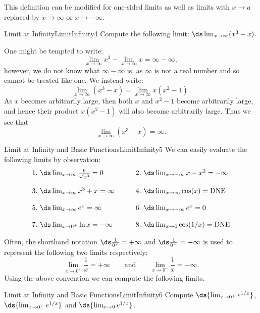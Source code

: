 This definition can be modified for one-sided limits as well as limits with $x\to a$ replaced by $x\to\infty$ or $x\to-\infty$.

\begin{example}{Limit at Infinity}{LimitInfinity4}
Compute the following limit: $\ds\lim_{x\to\infty}(x^3-x).$
\end{example}

\begin{solution} 
One might be tempted to write:
$$\lim_{x\to\infty}x^3-\lim_{x\to\infty}x=\infty-\infty,$$
however, we do not know what $\infty-\infty$ is, as $\infty$ is not a real number and so cannot be treated like one.
We instead write:
$$\lim_{x\to\infty}(x^3-x)=\lim_{x\to\infty}x(x^2-1).$$
As $x$ becomes arbitrarily large, then both $x$ and $x^2-1$ become arbitrarily large, and hence their product $x(x^2-1)$ will also become arbitrarily large. Thus we see that
$$\lim_{x\to\infty}(x^3-x)=\infty.$$
\end{solution}

\begin{example}{Limit at Infinity and Basic Functions}{LimitInfinity5}
We can easily evaluate the following limits by observation:
\[ \begin{array}{ll}
1.~\ds\lim_{x\to \infty} \frac{6}{\sqrt{x^3}}=0 & \qquad 2.~\ds\lim_{x\to -\infty} x-x^2=-\infty \\
\\
3.~\ds\lim_{x\to \infty}x^3+x=\infty            & \qquad 4.~\ds\lim_{x\to \infty} \cos(x)=\mbox{DNE} \\
\\
5.~\ds\lim_{x\to \infty} e^x=\infty             & \qquad 6.~\ds\lim_{x\to -\infty} e^x=0 \\
\\
7.~\ds\lim_{x\to 0^+} \ln x=-\infty             & \qquad 8.~\ds\lim_{x\to 0} \cos(1/x)=\mbox{DNE} \\
\end{array} \]
\end{example}

Often, the shorthand notation $\ds\frac{1}{0^+}=+\infty$ and $\ds\frac{1}{0^-}=-\infty$ is used to represent the following two limits respectively:
$$\lim_{x\to 0^+}\frac{1}{x}=+\infty\qquad\mbox{and}\qquad\lim_{x\to 0^-}\frac{1}{x}=-\infty.$$
Using the above convention we can compute the following limits.

\begin{example}{Limit at Infinity and Basic Functions}{LimitInfinity6}
Compute $\ds{\lim_{x\to 0^+} e^{1/x}}$, $\ds{\lim_{x\to 0^-} e^{1/x}}$ and $\ds{\lim_{x\to 0} e^{1/x}}$.
\end{example}


